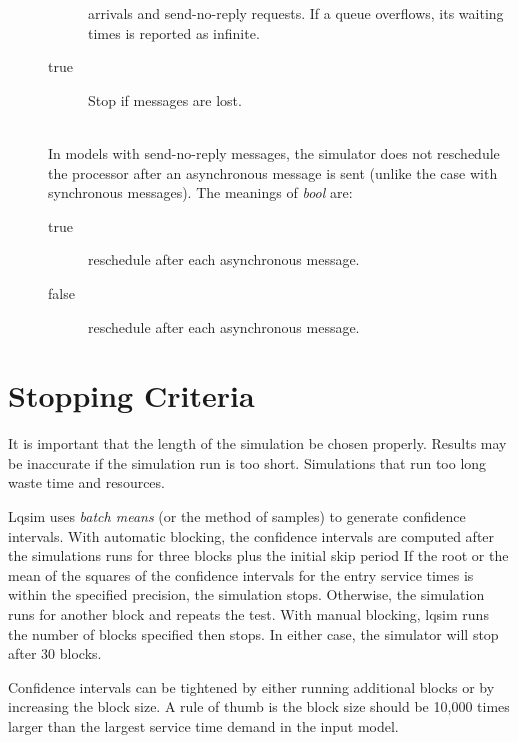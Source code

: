 \begin{description}
\begin{description}
    arrivals and
    send-no-reply requests.  If a queue
    overflows, its waiting times is reported as
    infinite.
  \item[true] Stop if messages are lost.
  \end{description}
\item[\optarg{reschedule-on-async-send}{\emph{=bool}}]~\\
  In models with send-no-reply messages, the
  simulator does not reschedule the processor after an asynchronous
  message is sent (unlike the case with synchronous messages).  The
  meanings of \emph{bool} are:
  \begin{description}
  \item[true] reschedule after each asynchronous message.
  \item[false] reschedule after each asynchronous message.
  \end{description}
\end{description}

\section{Stopping Criteria}
\label{sec:stopping-criteria}

It is important that the length of the
simulation be chosen properly.  Results may
be inaccurate if the simulation run is too short.  Simulations that
run too long waste time and resources.

Lqsim uses \emph{batch means} (or the method of
samples) to generate confidence
intervals.  With automatic
blocking, the
confidence intervals are computed after the simulations runs for three
blocks plus the initial skip period If the root or
the mean of the squares of the confidence
intervals for the entry service times is
within the specified precision, the simulation stops.  Otherwise, the
simulation runs for another block and repeats the test.  With manual
blocking, lqsim runs the number of blocks
specified then stops.  In either case, the simulator will stop after
30 blocks.

Confidence intervals can be tightened by either running additional
blocks or by increasing the block size.  A rule of
thumb is the block size should be 10,000 times larger than the largest
service time demand in the input model.

